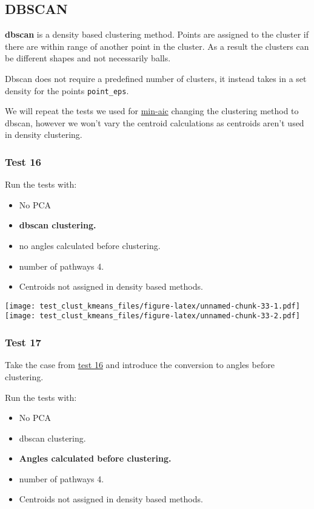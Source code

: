 \documentclass[
]{article}
\providecommand{\tightlist}{%
  \setlength{\itemsep}{0pt}\setlength{\parskip}{0pt}}
\begin{document}
\hypertarget{dbscan}{%
\subsection{DBSCAN}\label{dbscan}}

\textbf{dbscan} is a density based clustering method. Points are
assigned to the cluster if there are within range of another point in
the cluster. As a result the clusters can be different shapes and not
necessarily balls.

Dbscan does not require a predefined number of clusters, it instead
takes in a set density for the points \texttt{point\_eps}.

We will repeat the tests we used for \protect\hyperlink{minaic}{min-aic}
changing the clustering method to dbscan, however we won't vary the
centroid calculations as centroids aren't used in density clustering.

\hypertarget{test16}{%
\subsubsection{Test 16}\label{test16}}

Run the tests with:

\begin{itemize}
\tightlist
\item
  No PCA
\item
  \textbf{dbscan clustering.}
\item
  no angles calculated before clustering.
\item
  number of pathways 4.
\item
  Centroids not assigned in density based methods.
\end{itemize}

\texttt{[image: test\_clust\_kmeans\_files/figure-latex/unnamed-chunk-33-1.pdf]}
\texttt{[image: test\_clust\_kmeans\_files/figure-latex/unnamed-chunk-33-2.pdf]}

\hypertarget{test17}{%
\subsubsection{Test 17}\label{test17}}

Take the case from \protect\hyperlink{test16}{test 16} and introduce the
conversion to angles before clustering.

Run the tests with:

\begin{itemize}
\tightlist
\item
  No PCA
\item
  dbscan clustering.
\item
  \textbf{Angles calculated before clustering.}
\item
  number of pathways 4.
\item
  Centroids not assigned in density based methods.
\end{itemize}
\end{document}
